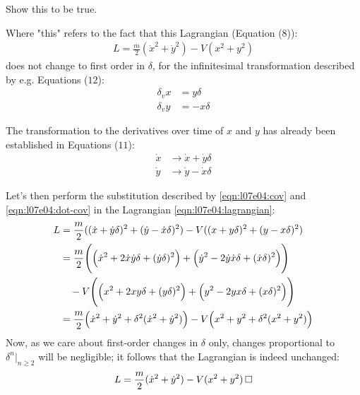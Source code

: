 \documentclass[solutions.tex]{subfiles}
\begin{document}
\maketitle
\begin{exercise}
Show this to be true.
\end{exercise}
Where "this" refers to the fact that this Lagrangian (Equation ($8$)):
\begin{align}
	L = \frac{m}{2}(\dot{x}^2+\dot{y}^2)-V(x^2 + y^2)
	\label{eqn:l07e04:lagrangian}
\end{align}
does not change to first order in $\delta$, for the infinitesimal
transformation described by e.g. Equations ($12$):
\begin{align}
	\delta_v x &= y\delta \nonumber\\
	\delta_v y &= -x\delta
	\label{eqn:l07e04:cov}
\end{align}

The transformation to the derivatives over time of $x$ and $y$
has already been established in Equations ($11$):
\begin{align}
	\dot{x} &\rightarrow \dot{x}+\dot{y}\delta \nonumber\\
	\dot{y} &\rightarrow \dot{y}-\dot{x}\delta
	\label{eqn:l07e04:dot-cov}
\end{align}

Let's then perform the substitution described by \eqref{eqn:l07e04:cov}
and \eqref{eqn:l07e04:dot-cov} in the Lagrangian \eqref{eqn:l07e04:lagrangian}:
\begin{align*}
	L &= \frac{m}{2}((\dot{x}+\dot{y}\delta)^2+(\dot{y}-\dot{x}\delta)^2)
		-V((x+y\delta)^2 + (y-x\delta)^2) \\
	~ &= \frac{m}{2}\Biggl(
		\Bigl(\dot{x}^2+2\dot{x}\dot{y}\delta+(\dot{y}\delta)^2\Bigr)
		+\Bigl(\dot{y}^2-2\dot{y}\dot{x}\delta+(\dot{x}\delta)^2\Bigr)
	\Biggr) \\
	~ &\quad -V\Biggl(
		\Bigl(x^2+2xy\delta+(y\delta)^2\Bigr)
		+\Bigl(y^2-2yx\delta+(x\delta)^2\Bigr)
	\Biggr) \\
	~ &=\frac{m}{2}\Bigl(\dot{x}^2+\dot{y}^2+\delta^2(\dot{x}^2+\dot{y}^2)\Bigr)
		-V\Bigl(x^2+y^2+\delta^2(x^2+y^2)\Bigr)
\end{align*}
Now, as we care about first-order changes in $\delta$ only, changes proportional
to $\delta^n\rvert_{n\geq 2}$ will be negligible; it follows that the Lagrangian
is indeed unchanged:
\[
	L = \frac{m}{2}(\dot{x}^2+\dot{y}^2)-V(x^2+y^2) \qed
\]
\end{document}
